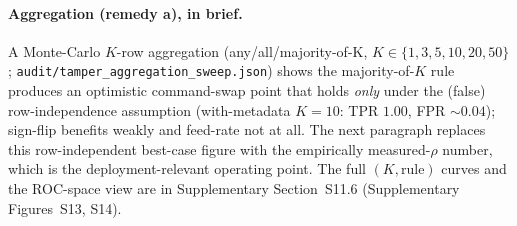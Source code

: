 \documentclass[sensors,article,submit,moreauthors,pdftex]{Definitions/mdpi}
\begin{document}
\paragraph{Aggregation (remedy a), in brief.} A Monte-Carlo $K$-row aggregation (any/all/majority-of-K, $K\!\in\!\{1,3,5,10,20,50\}$; \texttt{audit/tamper\_aggregation\_sweep.json}) shows the majority-of-$K$ rule produces an optimistic command-swap point that holds \emph{only} under the (false) row-independence assumption (with-metadata $K\!=\!10$: TPR $1.00$, FPR $\sim\!0.04$); sign-flip benefits weakly and feed-rate not at all. The next paragraph replaces this row-independent best-case figure with the empirically measured-$\rho$ number, which is the deployment-relevant operating point. The full $(K, \text{rule})$ curves and the ROC-space view are in Supplementary Section~S11.6 (Supplementary Figures~S13, S14).
\end{document}
